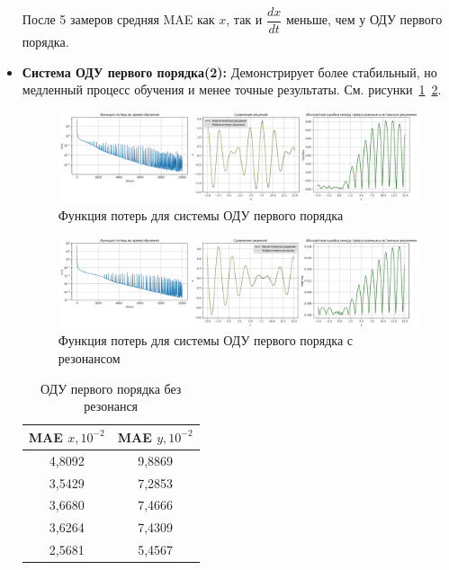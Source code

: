 \documentclass[12pt,a4paper]{article}
\begin{document}
\begin{itemize}
    После 5 замеров средняя MAE как $x$, так и $\dfrac{dx}{dt}$ меньше, чем у ОДУ первого порядка.

    \newpage
    \item \textbf{Система ОДУ первого порядка(2):} Демонстрирует более стабильный, но медленный процесс обучения и менее точные результаты. См. рисунки~\ref{fig:loss_first_order}~\ref{fig:loss_first_order_resonance}.
    
    \begin{figure}[h!]
        \centering
        \includegraphics[width=1\textwidth]{images/Loss&x_ODE_of_the_first_order.png}
        \caption{Функция потерь для системы ОДУ первого порядка}
        \label{fig:loss_first_order}
    \end{figure}

    \begin{figure}[h!]
        \centering
        \includegraphics[width=1\textwidth]{images/Loss&x_ODE_of_the_first_order_resonance.png}
        \caption{Функция потерь для системы ОДУ первого порядка с резонансом}
        \label{fig:loss_first_order_resonance}
    \end{figure}

    \begin{table}[h!]
        \centering
        \begin{tabular}{|c|c|}
        \hline
        \textbf{MAE $x, 10^{-2}$} & \textbf{MAE $y, 10^{-2}$} \\
        \hline
        4,8092 & 9,8869 \\
        3,5429 & 7,2853 \\
        3,6680 & 7,4666 \\
        3,6264 & 7,4309 \\
        2,5681 & 5,4567 \\
        \hline
        \end{tabular}
        \caption{ОДУ первого порядка без резонанся}
    \end{table}


\end{itemize}
\end{document}
